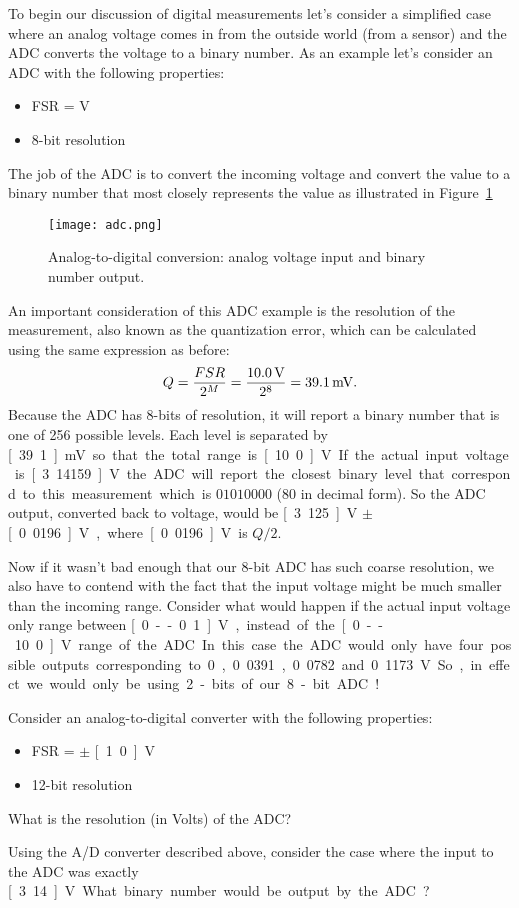 To begin our discussion of digital measurements let's consider a simplified case where an analog voltage comes in from the outside world (from a sensor) and the ADC converts the voltage to a binary number.  As an example let's consider an ADC with the following properties:
\begin{itemize}
\item FSR = \unit[0--10]{V}
\item 8-bit resolution
\end{itemize}

The job of the ADC is to convert the incoming voltage and convert the value to a binary number that most closely represents the value as illustrated in Figure~\ref{f:adc}
\begin{figure}[hbt!]
\centering
\texttt{[image: adc.png]}
\caption{Analog-to-digital conversion: analog voltage input and binary number output.}
\label{f:adc}
\end{figure}
An important consideration of this ADC example is the resolution of the measurement, also known as the quantization error, which can be calculated using the same expression as before:
\begin{equation}
Q = \frac{FSR}{2^M} = \frac{\unit[10.0]{V}}{2^8} = \unit[39.1]{mV}.
\end{equation}
Because the ADC has 8-bits of resolution, it will report a binary number that is one of 256 possible levels.  Each level is separated by \unit[39.1]{mV} so that the total range is \unit[10.0]{V}.  If the actual input voltage is \unit[3.14159]{V} the ADC will report the closest binary level that correspond to this measurement which is $01010000$ (80 in decimal form).  So the ADC output, converted back to voltage, would be \unit[3.125]{V} $\pm$ \unit[0.0196]{V}, where \unit[0.0196]{V} is $Q/2$.  

Now if it wasn't bad enough that our 8-bit ADC has such coarse resolution, we also have to contend with the fact that the input voltage might be much smaller than the incoming range.  Consider what would happen if the actual input voltage only range between \unit[0--0.1]{V}, instead of the \unit[0--10.0]{V} range of the ADC.  In this case the ADC would only have four possible outputs corresponding to 0, 0.0391, 0.0782 and 0.1173 V.  So, in effect we would only be using 2-bits of our 8-bit ADC!

\begin{ex}
Consider an analog-to-digital converter with the following properties:
\begin{itemize}
\item FSR = $\pm$ \unit[1.0]{V}
\item 12-bit resolution
\end{itemize}
What is the resolution (in Volts) of the ADC?  
\end{ex}
\begin{ex}
Using the A/D converter described above, consider the case where the input to the ADC was exactly \unit[3.14]{V}. What binary number would be output by the ADC?
\end{ex}

